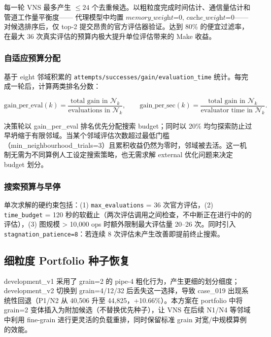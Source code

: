 \documentclass[bwprint]{gmcmthesis}
\begin{document}
每一轮 VNS 最多产生 $\leq 24$ 个去重候选。以粗粒度完成时间估计、通信量估计和管道工作量平衡度—— 代理模型中均置 $\textit{memory\_weight=0, cache\_weight=0}$—— 对候选排序后，仅 top-2 提交昂贵的官方评估器验证。达到 80\% 的便宜过滤率，在最大 36 次真实评估的预算内极大提升单位评估带来的 Make 收益。\cite{shahriari2016}

\subsubsection{自适应预算分配}

基于 eight 邻域积累的 \texttt{attempts/successes/gain/evaluation\_time} 统计。每完成一轮后，计算两类排名分数：

\[
\text{gain\_per\_eval}(k)=\frac{\text{total gain in }\mathcal{N}_k}{\text{evaluations in }\mathcal{N}_k},\qquad
\text{gain\_per\_sec}(k)=\frac{\text{total gain in }\mathcal{N}_k}{\text{evaluator time in }\mathcal{N}_k}.
\]

决策轮以 gain\_per\_eval 排名优先分配搜索 budget；同时以 20\% 均匀探索防止过早坍缩于有限邻域。当某个邻域评估次数超过最低门槛（min\_neighbourhood\_trials=3）且累积收益仍然为零时，邻域被去活。这一机制无需为不同算例人工设定搜索策略，也无需求解 external 优化问题来决定 budget 划分。\cite{mladenovic1997,hansen2001}

\subsubsection{搜索预算与早停}

单次求解的硬约束包括：(1) \texttt{max\_evaluations} = 36 次官方评估，(2) \texttt{time\_budget} = 120 秒的软截止（两次评估调用之间检查，不中断正在进行中的的评估），(3) 图规模 > 10,000 ops 时额外限制最大评估量 20–26 次。同时引入 \texttt{stagnation\_patience=8}：若连续 8 次评估未产生改善即提前终止搜索。

\subsection{细粒度 Portfolio 种子恢复}

development\_v1 采用了 grain=2 的 pipe-4 粗化行为，产生更细的划分细度；development\_v2 切换到 grain=4/12/32 后丢失这一选择，导致 case\_019 出现系统性回退（P1/N2 从 40,506 升至 44,825，+10.66\%）。本方案在 portfolio 中将 grain=2 变体插入为附加候选（不替换优先种子），让 VNS 在后续 N1/N4 等邻域中利用 fine-grain 进行更灵活的负载重排，同时保留标准 grain 对宽/中规模算例的效能。

\end{document}
